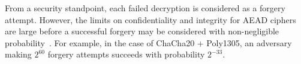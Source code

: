 From a security standpoint, each failed decryption is considered as a forgery
attempt. However, the limits on confidentiality and integrity for AEAD ciphers
are large before a successful forgery may be considered with non-negligible
probability~\cite{luykx2015limits, aeadlimits}. For example, in the case of
ChaCha20 + Poly1305, an adversary making $2^{60}$ forgery attempts succeeds with
probability $2^{-33}$.


%

